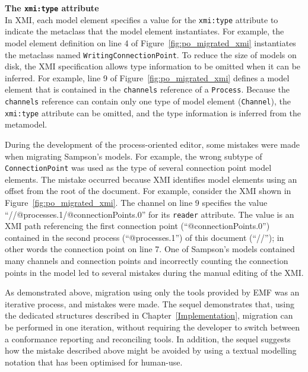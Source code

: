\begin{framed}
\textbf{The \texttt{xmi:type} attribute} \\
In XMI, each model element specifies a value for the \texttt{xmi:type} attribute to indicate the metaclass that the model element instantiates. For example, the model element definition on line 4 of Figure~\ref{fig:po_migrated_xmi} instantiates the metaclass named \texttt{Wr\-i\-ti\-ngCo\-nn\-ec\-ti\-o\-nPo\-i\-nt}. To reduce the size of models on disk, the XMI specification allows type information to be omitted when it can be inferred. For example, line 9 of Figure~\ref{fig:po_migrated_xmi} defines a model element that is contained in the \texttt{ch\-an\-ne\-ls} reference of a \texttt{Pr\-o\-ce\-ss}. Because the \texttt{ch\-an\-ne\-ls} reference can contain only one type of model element (\texttt{Ch\-an\-n\-el}), the \texttt{xmi:type} attribute can be omitted, and the type information is inferred from the metamodel.
\end{framed}



During the development of the process-oriented editor, some mistakes were made when migrating Sampson's models. For example, the wrong subtype of \texttt{Co\-nn\-ec\-ti\-onPo\-in\-t} was used as the type of several connection point model elements. The mistake occurred because XMI identifies model elements using an offset from the root of the document. For example, consider the XMI shown in Figure~\ref{fig:po_migrated_xmi}. The channel on line 9 specifies the value ``//@processes.1/@connectionPoints.0'' for its \texttt{re\-ad\-er} attribute. The value is an XMI path referencing the first connection point (``@connectionPoints.0'') contained in the second process (``@processes.1'') of this document (``//''); in other words the connection point on line 7. One of Sampson's models contained many channels and connection points and incorrectly counting the connection points in the model led to several mistakes during the manual editing of the XMI.


As demonstrated above, migration using only the tools provided by EMF was an iterative process, and mistakes were made. The sequel demonstrates that, using the dedicated structures described in Chapter~\ref{Implementation}, migration can be performed in one iteration, without requiring the developer to switch between a conformance reporting and reconciling tools. In addition, the sequel suggests how the mistake described above might be avoided by using a textual modelling notation that has been optimised for human-use.


